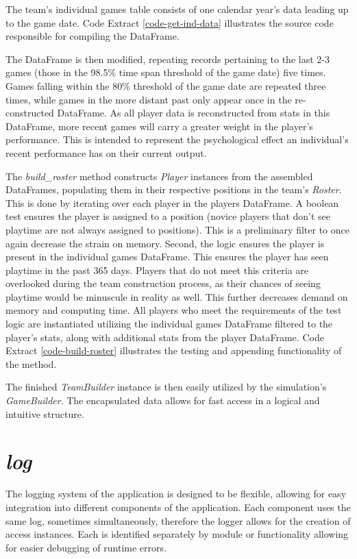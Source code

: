 \documentclass{thesis-ekf}
\theoremstyle{definition}
\theoremstyle{remark}
\begin{document}
The team's individual games table consists of one calendar year's data leading up to the game date. Code Extract \ref{code-get-ind-data} illustrates the source code responsible for compiling the DataFrame.

The DataFrame is then modified, repeating records pertaining to the last 2-3 games (those in the 98.5\% time span threshold of the game date) five times. Games falling within the 80\% threshold of the game date are repeated three times, while games in the more distant past only appear once in the re-constructed DataFrame. As all player data is reconstructed from stats in this DataFrame, more recent games will carry a greater weight in the player's performance. This is intended to represent the psychological effect an individual's recent performance has on their current output.

The \emph{build\_roster} method constructs \emph{Player} instances from the assembled DataFrames, populating them in their respective positions in the team's \emph{Roster}. This is done by iterating over each player in the players DataFrame. A boolean test ensures the player is assigned to a position (novice players that don't see playtime are not always assigned to positions). This is a preliminary filter to once again decrease the strain on memory. Second, the logic ensures the player is present in the individual games DataFrame. This ensures the player has seen playtime in the past 365 days. Players that do not meet this criteria are overlooked during the team construction process, as their chances of seeing playtime would be minuscule in reality as well. This further decreases demand on memory and computing time. All players who meet the requirements of the test logic are instantiated utilizing the individual games DataFrame filtered to the player's stats, along with additional stats from the player DataFrame. Code Extract \ref{code-build-roster} illustrates the testing and appending functionality of the method.

The finished \emph{TeamBuilder} instance is then easily utilized by the simulation's \emph{GameBuilder}. The encapsulated data allows for fast access in a logical and intuitive structure.

\section{\emph{log}}
The logging system of the application is designed to be flexible, allowing for easy integration into different components of the application. Each component uses the same log, sometimes simultaneously, therefore the logger allows for the creation of access instances. Each is identified separately by module or functionality allowing for easier debugging of runtime errors. 
\end{document}
